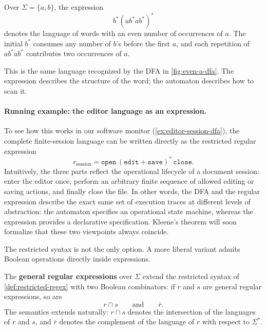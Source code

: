 \begin{example}
\label{ex:regex-even-a}
Over $\Sigma=\{a,b\}$, the expression
\[
  b^*(ab^*ab^*)^*
\]
denotes the language of words with an even number of occurrences of
$a$.  The initial $b^*$ consumes any number of $b$'s before the first
$a$, and each repetition of $ab^*ab^*$ contributes two occurrences of
$a$.
\end{example}

This is the same language recognized by the DFA in
\cref{fig:even-a-dfa}.  The expression describes the structure of the
word; the automaton describes how to scan it.

\paragraph{Running example: the editor language as an expression.}
To see how this works in our software monitor (\cref{ex:editor-session-dfa}), the complete finite-session language can be written directly as the restricted regular expression
\[
  r_{\mathrm{session}}
  =
  \texttt{open}\,
  (\texttt{edit}+\texttt{save})^*\,
  \texttt{close}.
\]
Intuitively, the three parts reflect the operational lifecycle of a document session: enter the editor once, perform an arbitrary finite sequence of allowed editing or saving actions, and finally close the file. In other words, the DFA and the regular expression describe the exact same set of execution traces at different levels of abstraction: the automaton specifies an operational state machine, whereas the expression provides a declarative specification. Kleene's theorem will soon formalize that these two viewpoints always coincide.

The restricted syntax is not the only option.  A more liberal variant
admits Boolean operations directly inside expressions.

\begin{definition}
\label{def:general-regex}
The \textbf{general regular expressions} over $\Sigma$ extend the
restricted syntax of \cref{def:restricted-regex} with two Boolean
combinators: if $r$ and $s$ are general regular expressions, so are
\[
  r \cap s \qquad\text{and}\qquad \overline{r}.
\]
The semantics extends naturally: $r \cap s$ denotes the intersection of
the languages of $r$ and $s$, and $\overline{r}$ denotes the complement
of the language of $r$ with respect to $\Sigma^*$.
\end{definition}

